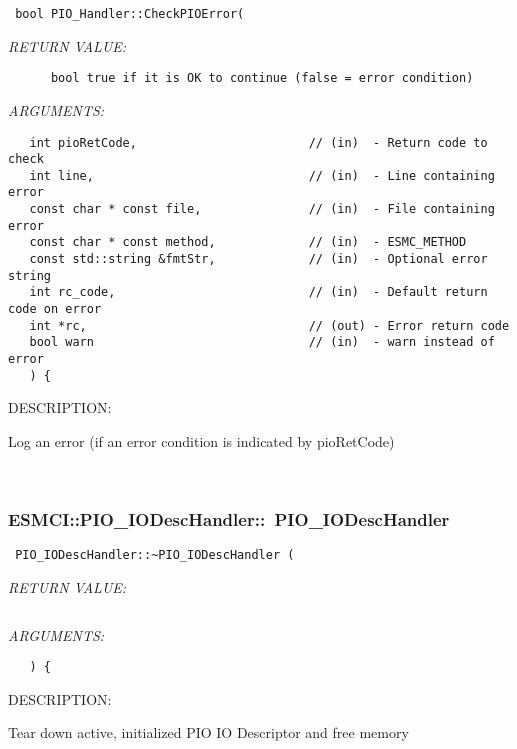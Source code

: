   
\begin{verbatim} bool PIO_Handler::CheckPIOError(\end{verbatim}{\em RETURN VALUE:}
\begin{verbatim}      bool true if it is OK to continue (false = error condition)\end{verbatim}{\em ARGUMENTS:}
\begin{verbatim}   int pioRetCode,                        // (in)  - Return code to check
   int line,                              // (in)  - Line containing error
   const char * const file,               // (in)  - File containing error
   const char * const method,             // (in)  - ESMC_METHOD
   const std::string &fmtStr,             // (in)  - Optional error string
   int rc_code,                           // (in)  - Default return code on error
   int *rc,                               // (out) - Error return code
   bool warn                              // (in)  - warn instead of error
   ) {\end{verbatim}
{\sf DESCRIPTION:\\ }


      Log an error (if an error condition is indicated by pioRetCode)
   
 
\mbox{}\hrulefill\
 
\subsubsection [ESMCI::PIO\_IODescHandler::~PIO\_IODescHandler] {ESMCI::PIO\_IODescHandler::~PIO\_IODescHandler}


  
\begin{verbatim} PIO_IODescHandler::~PIO_IODescHandler (\end{verbatim}{\em RETURN VALUE:}
\begin{verbatim}      \end{verbatim}{\em ARGUMENTS:}
\begin{verbatim}   ) {\end{verbatim}
{\sf DESCRIPTION:\\ }


      Tear down active, initialized PIO IO Descriptor and free memory
   
 
